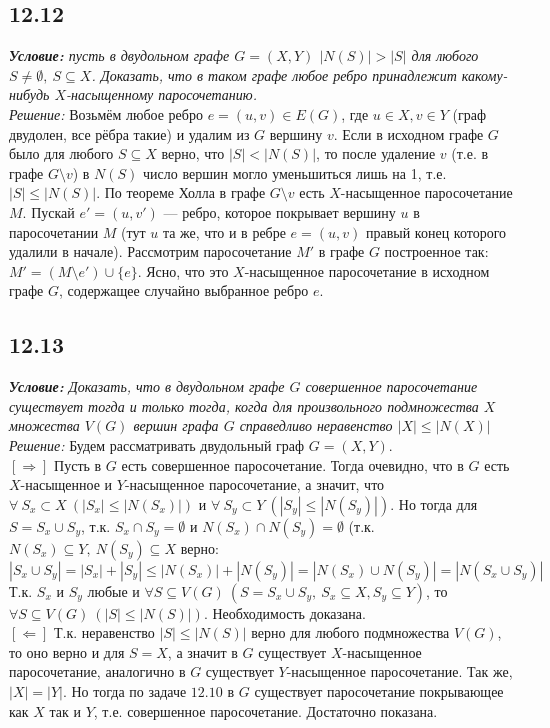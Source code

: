 \subsection*{12.12}
\textit{\textbf{Условие:} пусть в двудольном графе $G=(X,Y)$ $|N(S)| > |S|$ для любого $S \neq \emptyset,\ S \subseteq X$. Доказать, что в таком графе любое ребро принадлежит какому-нибудь $X$-насыщенному паросочетанию. }\\
\textit{Решение:} Возьмём любое ребро $e = (u, v) \in E(G)$, где $u \in X, v \in Y$ (граф двудолен, все рёбра такие) и удалим из $G$ вершину $v$. Если в исходном графе $G$ было для любого $S \subseteq X$ верно, что $|S| < |N(S)|$, то после удаление $v$ (т.е. в графе $G\setminus v$) в $N(S)$ число вершин могло уменьшиться лишь на 1, т.е. $|S| \leq |N(S)|$. По теореме Холла в графе $G\setminus v$ есть $X$-насыщенное паросочетание $M$. Пускай $e' = (u,v')$ --- ребро, которое покрывает вершину $u$ в паросочетании $M$ (тут $u$ та же, что и в ребре $e = (u,v)$ правый конец которого удалили в начале). Рассмотрим паросочетание $M'$ в графе $G$ построенное так: $M' = (M\setminus e') \cup \lbrace e \rbrace$. Ясно, что это $X$-насыщенное паросочетание в исходном графе $G$, содержащее случайно выбранное ребро $e$. \xqed
\subsection*{12.13}
\textit{\textbf{Условие:} Доказать, что в двудольном графе $G$ совершенное паросочетание существует тогда и только тогда, когда для произвольного подмножества $X$ множества $V(G)$ вершин графа $G$ справедливо неравенство $|X|\leq |N(X)|$}\\
\textit{Решение:} Будем рассматривать двудольный граф $G=(X,Y)$.\\
$ \left[  \Rightarrow \right] $ Пусть в $G$ есть совершенное паросочетание. Тогда очевидно, что в $G$ есть $X$-насыщенное и $Y$-насыщенное паросочетание, а значит, что $\forall~S_x \subset X\ (|S_x| \leq |N(S_x)|)$ и $\forall~S_y \subset Y\ (|S_y| \leq |N(S_y)|)$. Но тогда для $S = S_x \cup S_y$, т.к. $S_x \cap S_y = \emptyset$ и $N(S_x) \cap N(S_y) = \emptyset$ (т.к. $N(S_x)\subseteq Y,\ N(S_y) \subseteq X$ верно:
\[
	|S_x\cup S_y| = |S_x| + |S_y| \leq |N(S_x)| + |N(S_y)| = |N(S_x)\cup N(S_y)| = |N(S_x \cup S_y)|
\]
Т.к. $S_x$ и $S_y$ любые и $\forall S \subseteq V(G)\ (S = S_x \cup S_y,\ S_x \subseteq X, S_y \subseteq Y)$, то $\forall S \subseteq V(G)\ (|S| \leq |N(S)|)$. Необходимость доказана.\\
$ \left[  \Leftarrow \right] $ Т.к. неравенство $|S| \leq |N(S)|$ верно для любого подмножества $V(G)$, то оно верно
и для $S=X$, а значит в $G$ существует $X$-насыщенное паросочетание, аналогично в $G$ существует $Y$-насыщенное паросочетание. Так же, $|X|=|Y|$. Но тогда по задаче $12.10$ в $G$ существует паросочетание покрывающее как $X$ так и $Y$, т.е. совершенное паросочетание. Достаточно показана. \xqed 

